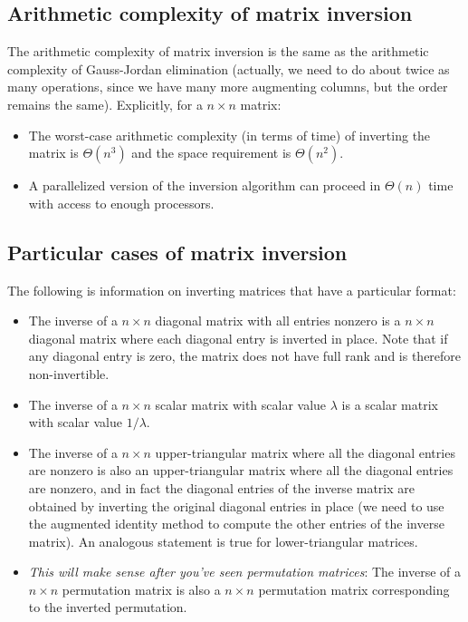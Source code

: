\documentclass[10pt]{amsart}
\begin{document}
\subsection{Arithmetic complexity of matrix inversion}

The arithmetic complexity of matrix inversion is the same as the
arithmetic complexity of Gauss-Jordan elimination (actually, we need
to do about twice as many operations, since we have many more
augmenting columns, but the order remains the same). Explicitly, for a
$n \times n$ matrix:

\begin{itemize}
\item The worst-case arithmetic complexity (in terms of time) of
  inverting the matrix is $\Theta(n^3)$ and the space requirement is
  $\Theta(n^2)$.
\item A parallelized version of the inversion algorithm can proceed in
  $\Theta(n)$ time with access to enough processors.
\end{itemize}

\subsection{Particular cases of matrix inversion}

The following is information on inverting matrices that have a
particular format:

\begin{itemize}
\item The inverse of a $n \times n$ diagonal matrix with all entries
  nonzero is a $n \times n$ diagonal matrix where each diagonal entry
  is inverted in place. Note that if any diagonal entry is zero, the
  matrix does not have full rank and is therefore non-invertible.
\item The inverse of a $n \times n$ scalar matrix with scalar value
  $\lambda$ is a scalar matrix with scalar value $1/\lambda$.
\item The inverse of a $n \times n$ upper-triangular matrix where all
  the diagonal entries are nonzero is also an upper-triangular matrix
  where all the diagonal entries are nonzero, and in fact the diagonal
  entries of the inverse matrix are obtained by inverting the original
  diagonal entries in place (we need to use the augmented identity
  method to compute the other entries of the inverse matrix). An
  analogous statement is true for lower-triangular matrices.
\item {\em This will make sense after you've seen permutation
  matrices}: The inverse of a $n \times n$ permutation matrix is also
  a $n \times n$ permutation matrix corresponding to the inverted
  permutation.
\end{itemize}
\end{document}
